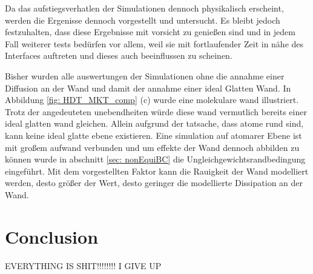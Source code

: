 Da das aufstiegsverhatlen der Simulationen dennoch physikalisch erscheint, werden die Ergenisse dennoch vorgestellt und untersucht. Es bleibt jedoch festzuhalten, dass diese Ergebnisse mit vorsicht zu genießen sind und in jedem Fall weiterer tests bedürfen vor allem, weil sie mit fortlaufender Zeit in nähe des Interfaces auftreten und dieses auch beeinflussen zu scheinen. 

Bisher wurden alle auswertungen der Simulationen ohne die annahme einer Diffusion an der Wand und damit der annahme einer ideal Glatten Wand. In Abbildung \ref{fig: HDT_MKT_comp} (c) wurde eine molekulare wand illustriert. Trotz der angedeuteten unebendheiten würde diese wand vermutlich bereits einer ideal glatten wand gleichen. Allein aufgrund der tatsache, dass atome rund sind, kann keine ideal glatte ebene existieren. Eine simulation auf atomarer Ebene ist mit großem aufwand verbunden und um effekte der Wand dennoch abbilden zu können wurde in abschnitt \ref{sec: nonEquiBC} die Ungleichgewichtsrandbedingung eingeführt. Mit dem vorgestellten Faktor kann die Rauigkeit der Wand modelliert werden, desto größer der Wert, desto geringer die modellierte Dissipation an der Wand. 



\section{Conclusion}

EVERYTHING IS SHIT!!!!!!!!
I GIVE UP